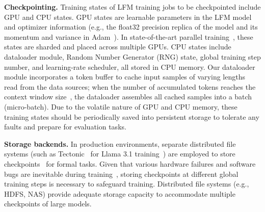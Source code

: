 \noindent \textbf{Checkpointing.}
Training states of LFM training jobs to be checkpointed include GPU and CPU states.
GPU states are learnable parameters in the LFM model and optimizer information (e.g., the float32 precision replica of the model and its momentum and variance in Adam~\cite{adam}). %
In %
state-of-the-art parallel training~\cite{megatron-lm3}, these states are sharded and placed across multiple GPUs. %
CPU states include 
 dataloader module, Random Number Generator (RNG) state, global training step number, and learning-rate scheduler, all stored in CPU memory. 
Our dataloader module incorporates a %
token buffer to cache input samples of varying lengths read from the data sources;
when the number of accumulated tokens reaches the context window size~\cite{megascale, llama3.1, opt, glm}, the dataloader assembles all cached samples into a batch (micro-batch). 
Due to the volatile nature of GPU and CPU memory, %
these training states should be periodically saved into persistent storage to tolerate any faults and prepare for evaluation tasks.

\noindent \textbf{Storage backends.} 
In production environments, %
separate distributed file systems (such as Tectonic~\cite{tectonic} for Llama 3.1 training~\cite{llama3.1}) are employed to store checkpoints~\cite{check-n-run, unicron} for formal tasks.
Given that various hardware failures and software bugs are inevitable during training~\cite{llama3.1, megascale,characterization}, storing checkpoints at different global training steps is necessary to safeguard training. %
Distributed file systems (e.g., HDFS, NAS) provide adequate storage capacity to accommodate multiple checkpoints of large models. 

